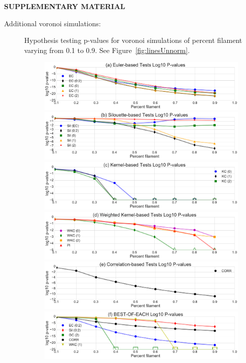 \documentclass[12pt]{article}
\newcommand{\figref}[1]{Figure~\ref{#1}}
\begin{document}

\bigskip
\begin{center}
{\large\bf SUPPLEMENTARY MATERIAL}
\end{center}

\begin{description}

\item[Additional voronoi simulations:] Hypothesis testing p-values for voronoi simulations of percent filament varying from 0.1 to 0.9. See \figref{fig:linesUnnorm}.

\begin{figure}[htp!]
  \centering
  \includegraphics[width=0.7\linewidth]{euler_lineplot_log10_norm_False.pdf}
    \includegraphics[width=0.7\linewidth]{silh_lineplot_log10_norm_False.pdf}
    \includegraphics[width=0.7\linewidth]{smooth_lineplot_log10_norm_False.pdf}
    \includegraphics[width=0.7\linewidth]{weight_lineplot_log10_norm_False.pdf}
    \includegraphics[width=0.7\linewidth]{corr_lineplot_log10_norm_False.pdf}
    \includegraphics[width=0.7\linewidth]{cross_lineplot_log10_norm_False.pdf}

\end{figure}
\end{description}
\end{document}
